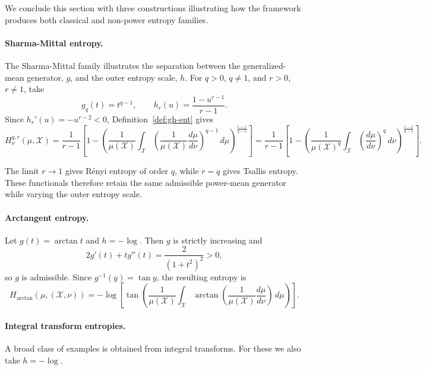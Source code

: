 \documentclass[reqno]{amsart}
\begin{document}
We conclude this section with three constructions illustrating how the framework produces both classical and non-power entropy families.
\\

\paragraph{\bf Sharma-Mittal entropy.}
The Sharma-Mittal family \cite{SharMitt75,SharMitt77,Masi05} illustrates the separation between
the generalized-mean generator, $g$, and the outer entropy scale, $h$. For
$q>0$, $q\neq 1$, and $r>0$, $r\neq 1$, take
$$
g_q(t)=t^{q-1},
\qquad
h_r(u)=\frac{1-u^{r-1}}{r-1}.
$$
Since $h_r'(u)=-u^{r-2}<0$,
Definition~\ref{def:gh-ent} gives
\begin{equation}
H_{\nu}^{q,r}(\mu,\mathcal{X})
=
\frac{1}{r-1}
\left[
1-
\left(
\frac{1}{\mu(\mathcal{X})}
\int_{\mathcal{X}}
\left(
\frac{1}{\mu(\mathcal{X})}
\frac{d\mu}{d\nu}
\right)^{q-1}
\,d\mu
\right)^{\frac{r-1}{q-1}}
\right]
=
\frac{1}{r-1}
\left[
1-
\left(
\frac{1}{\mu(\mathcal{X})^q}
\int_{\mathcal{X}}
\left(
\frac{d\mu}{d\nu}
\right)^q
\,d\nu
\right)^{\frac{r-1}{q-1}}
\right].
\end{equation}


The limit $r\rightarrow 1$ gives R\'enyi entropy of order $q$, while $r=q$ gives Tsallis entropy. These functionals therefore retain the same admissible power-mean generator while varying the outer entropy
scale.
\\



\paragraph{\bf Arctangent entropy.}
Let $g(t)=\arctan t$ and $h=-\log$.
Then $g$ is strictly increasing and
$$
2g'(t)+t g''(t)
=
\frac{2}{(1+t^2)^2}>0,
$$
so $g$ is admissible. Since $g^{-1}(y)=\tan y$,
the resulting entropy is
$$
H_{\arctan}(\mu,(\mathcal{X},\nu)) =
-\log
\left[
\tan
\left(
\frac{1}{\mu(\mathcal{X})}
\int_{\mathcal{X}}
\arctan
\left(
\frac{1}{\mu(\mathcal{X})}
\frac{d\mu}{d\nu}
\right)
\,d\mu
\right)
\right].
$$


\paragraph{\bf Integral transform entropies.}
A broad class of examples is obtained from integral transforms. For these we also take $h=-\log$.
\end{document}
